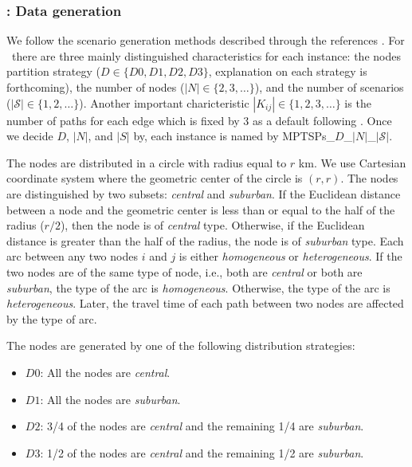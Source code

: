 \subsubsection{\mptsps: Data generation} \label{mptsps:datagen}
We follow the scenario generation methods described through the references \cite{journal:MPT2014,journal:PGM2017,journal:TPP2017}. For \mptsps\, there are three mainly distinguished characteristics for each instance: the nodes partition strategy ($D\in\{D0,D1,D2,D3\}$, explanation on each strategy is forthcoming), the number of nodes ($|N|\in\{2,3,\ldots\}$), and the number of scenarios ($|\mathcal{S}|\in\{1,2,\ldots\}$). Another important charicteristic $|K_{ij}|\in\{1,2,3,\ldots\}$ is the number of paths for each edge which is fixed by 3 as a default following \cite{journal:TPP2017}. Once we decide $D$, $|N|$, and $|S|$ by, each instance is named by MPTSPs\_$D$\_$|N|$\_$|\mathcal{S}|$.

The nodes are distributed in a circle with radius equal to $r$ km. We use Cartesian coordinate system where the geometric center of the circle is $(r,r)$. The nodes are distinguished by two subsets: \textit{central} and \textit{suburban}. If the Euclidean distance between a node and the geometric center is less than or equal to the half of the radius ($r/2$), then the node is of \textit{central} type. Otherwise, if the Euclidean distance is greater than the half of the radius, the node is of \textit{suburban} type. Each arc between any two nodes $i$ and $j$ is either \textit{homogeneous} or \textit{heterogeneous}. If the two nodes are of the same type of node, i.e., both are \textit{central} or both are \textit{suburban}, the type of the arc is \textit{homogeneous}. Otherwise, the type of the arc is \textit{heterogeneous}. Later, the travel time of each path between two nodes are affected by the type of arc. 

The nodes are generated by one of the following distribution strategies:
\begin{itemize}
	\item $D0$: All the nodes are \textit{central}.
	\item $D1$: All the nodes are \textit{suburban}.
	\item $D2$: 3/4 of the nodes are \textit{central} and the remaining 1/4 are \textit{suburban}.
	\item $D3$: 1/2 of the nodes are \textit{central} and the remaining 1/2 are \textit{suburban}.
\end{itemize}

